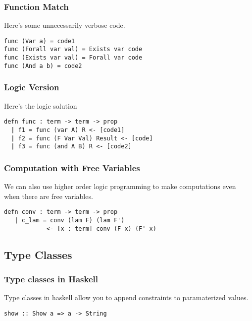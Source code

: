 \begin{frame}[fragile]
\frametitle{Function Match}

Here's some unnecessarily verbose code.

\begin{lstlisting}
func (Var a) = code1
func (Forall var val) = Exists var code
func (Exists var val) = Forall var code
func (And a b) = code2
\end{lstlisting}
\end{frame}


\begin{frame}[fragile]
\frametitle{Logic Version}

Here's the logic solution

\begin{lstlisting}
defn func : term -> term -> prop 
  | f1 = func (var A) R <- [code1]
  | f2 = func (F Var Val) Result <- [code]
  | f3 = func (and A B) R <- [code2]
\end{lstlisting}
\end{frame}


\begin{frame}[fragile]
\frametitle{Computation with Free Variables}

We can also use higher order logic programming to make computations even when 
there are free variables.

\begin{lstlisting}
defn conv : term -> term -> prop
   | c_lam = conv (lam F) (lam F') 
            <- [x : term] conv (F x) (F' x)
\end{lstlisting}
\end{frame}

\subsection{Type Classes}

\begin{frame}[fragile]
\frametitle{Type classes in Haskell}

Type classes in haskell allow you to append constraints
to paramaterized values.

\begin{lstlisting}
show :: Show a => a -> String
\end{lstlisting}
\end{frame}

